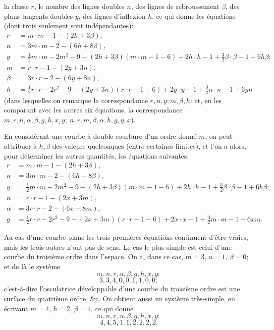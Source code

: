 \documentclass[11pt]{article}
\begin{document}
la classe $r$, le nombre des lignes doubles $n$, des lignes de rebroussement $\beta$, des plans tangents doubles $y$, des lignes d'inflexion $h$, ce qui donne les \'equations (dont trois seulement sont ind\'ependantes):
\begin{align*}
r &= m\cdot m - 1 - (2h + 3\beta),\\
n &= 3m\cdot m - 2 - (6h + 8\beta),\\
y &= \tfrac12 m\cdot m - 2m^2 - 9 - (2h + 3\beta)(m\cdot m - 1 - 6) + 2h\cdot h - 1 + \tfrac32 \beta\cdot\beta - 1 + 6h\beta;\\
m &= r\cdot r - 1 - (2y + 3n),\\
\beta &= 3r\cdot r - 2 - (6y + 8n),\\
h &= \tfrac12 r\cdot r - 2r^2 - 9 - (2y + 3n)(r\cdot r - 1 - 6) + 2y\cdot y - 1 + \tfrac32 n\cdot n - 1 + 6yn
\end{align*}
(dans lesquelles on remarque la correspondance $r, n, y; m, \beta, h$: et, en les comparant avec les autres six \'equations, la correspondance $m, r, n, \alpha, \beta, g, h, x, y;\ n, r, m, \beta, \alpha, h, g, y, x$).

En consid\'erant une courbe \`a double courbure d'un ordre donn\'e $m$, on peut attribuer \`a $h, \beta$ des valeurs quelconques (entre certaines limites), et l'on a alors, pour d\'eterminer les autres quantit\'es, les \'equations suivantes:
\begin{align*}
r &= m\cdot m - 1 - (2h + 3\beta),\\
n &= 3m\cdot m - 2 - (6h + 8\beta),\\
y &= \tfrac12 m\cdot m - 2m^2 - 9 - (2h + 3\beta)(m\cdot m - 1 - 6) + 2h\cdot h - 1 + \tfrac32 \beta\cdot\beta - 1 + 6h\beta;\\
n &= r\cdot r - 1 - (2x + 3m),\\
\alpha &= 3r\cdot r - 2 - (6x + 8m),\\
g &= \tfrac12 r\cdot r - 2r^2 - 9 - (2x + 3m)(r\cdot r - 1 - 6) + 2x\cdot x - 1 + \tfrac32 m\cdot m - 1 + 6xm.
\end{align*}

Au cas d'une courbe plane les trois premi\`eres \'equations continuent d'\^etre vraies, mais les trois autres n'ont pas de sens. Le cas le plus simple est celui d'une courbe du troisi\`eme ordre dans l'espace. On a, dans ce cas, $m = 3$, $n = 1$, $\beta = 0$; et de l\`a le syst\`eme
\[
m, n, r, \alpha, \beta, g, h, x, y;
\]
\[
3, 3, 4, 0, 0, 1, 1, 0, 0;
\]
c'est-\`a-dire l'osculatrice d\'eveloppable d'une courbe du troisi\`eme ordre est une surface du quatri\`eme ordre, \&c. On obtient aussi un syst\`eme tr\`es-simple, en \'ecrivant $m = 4$, $h = 2$, $\beta = 1$, ce qui donne
\[
m, n, r, \alpha, \beta, g, h, x, y;
\]
\[
4, 4, 5, 1, 1, 2, 2, 2, 2.
\]
\end{document}
